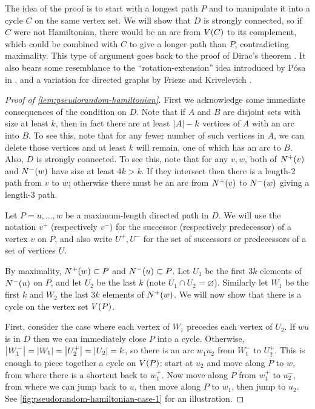 \documentclass[11pt,english]{article}
\theoremstyle{plain}
\theoremstyle{definition}
\theoremstyle{definition}
\theoremstyle{plain}
\theoremstyle{plain}
\theoremstyle{plain}
\theoremstyle{plain}
\theoremstyle{remark}
\theoremstyle{remark}
\let\originalleft\left
\let\originalright\right
\renewcommand{\left}{\mathopen{}\mathclose\bgroup\originalleft}
\renewcommand{\right}{\aftergroup\egroup\originalright}
\begin{document}
The idea of the proof is to start with a longest path $P$ and to manipulate
it into a cycle $C$ on the same vertex set. We will show that $D$
is strongly connected, so if $C$ were not Hamiltonian, there would
be an arc from $V\left(C\right)$ to its complement, which could be
combined with $C$ to give a longer path than $P$, contradicting
maximality. This type of argument goes back to the proof of Dirac's
theorem \cite[Theorem~3]{Dir52}. It also bears some resemblance to
the ``rotation-extension'' idea introduced by P\'osa in \cite{Pos76}, and
a variation for directed graphs by Frieze and Krivelevich \cite[Section~4.3]{FK05}.
\begin{proof}
[Proof of \ref{lem:pseudorandom-hamiltonian}]First we acknowledge
some immediate consequences of the condition on $D$. Note that if
$A$ and $B$ are disjoint sets with size at least $k$, then in fact
there are at least $\left|A\right|-k$ vertices of $A$ with an arc into $B$.
To see this, note that for any fewer number of such vertices in $A$,
we can delete those vertices and at least $k$ will remain, one of
which has an arc to $B$. Also, $D$ is strongly connected. To see
this, note that for any $v,w$, both of $N^{+}\left(v\right)$ and
$N^{-}\left(w\right)$ have size at least $4k>k$. If they intersect
then there is a length-2 path from $v$ to $w$; otherwise there must
be an arc from $N^{+}\left(v\right)$ to $N^{-}\left(w\right)$ giving
a length-3 path.

Let $P=u,\dots,w$ be a maximum-length directed path in $D$. We will
use the notation $v^{+}$ (respectively $v^{-}$) for the successor
(respectively predecessor) of a vertex $v$ on $P$, and also write
$U^{+},U^{-}$ for the set of successors or predecessors of a set
of vertices $U$.

By maximality, $N^{+}\left(w\right)\subset P$ and $N^{-}\left(u\right)\subset P$.
Let $U_{1}$ be the first $3k$ elements of $N^{-}\left(u\right)$
on $P$, and let $U_{2}$ be the last $k$ (note $U_{1}\cap U_{2}=\varnothing$).
Similarly let $W_{1}$ be the first $k$ and $W_{2}$ the last $3k$
elements of $N^{+}\left(w\right)$. We will now show that there is
a cycle on the vertex set $V\left(P\right)$.

First, consider the case where each vertex of $W_{1}$ precedes each
vertex of $U_{2}$. If $wu$ is in $D$ then we can immediately close
$P$ into a cycle. Otherwise, $\left|W_{1}^{-}\right|=\left|W_{1}\right|=\left|U_{2}^{+}\right|=\left|U_{2}\right|=k$,
so there is an arc $w_{1}u_{2}$ from $W_{1}^{-}$ to $U_{2}^{+}$.
This is enough to piece together a cycle on $V\left(P\right)$: start
at $u_{2}$ and move along $P$ to $w$, from where there is a shortcut
back to $w_{1}^{+}$. Now move along $P$ from $w_{1}^{+}$ to $u_{2}^{-}$,
from where we can jump back to $u$, then move along $P$ to $w_{1}$,
then jump to $u_{2}$. See \ref{fig:pseudorandom-hamiltonian-case-1}
for an illustration.


\end{proof}
\end{document}
